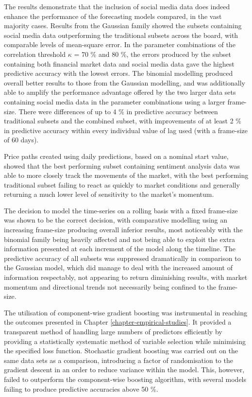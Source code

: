 \documentclass{article}
\begin{document}
The results demonstrate that the inclusion of social media data does indeed enhance the performance of the forecasting models compared, in the vast majority cases. Results from the Gaussian family showed the subsets containing social media data outperforming the traditional subsets across the board, with comparable levels of mean-square error. In the parameter combinations of the correlation threshold $\kappa$ = 70 \% and 80 \%, the errors produced by the subset containing both financial market data and social media data gave the highest predictive accuracy with the lowest errors. The binomial modelling produced overall better results to those from the Gaussian modelling, and was additionally able to amplify the performance advantage offered by the two larger data sets containing social media data in the parameter combinations using a larger frame-size. There were differences of up to 4 \% in predictive accuracy between traditional subsets and the combined subset, with improvements of at least 2 \% in predictive accuracy within every individual value of lag used (with a frame-size of 60 days). 

Price paths created using daily predictions, based on a nominal start value, showed that the best performing subset containing sentiment analysis data was able to more closely track the movements of the market, with the best performing traditional subset failing to react as quickly to market conditions and generally returning a much lower level of sensitivity to the market's momentum.

The decision to model the time-series on a rolling basis with a fixed frame-size was shown to be the correct decision, with comparative modelling using an increasing frame-size producing overall inferior results, most noticeably with the binomial family being heavily affected and not being able to exploit the extra information presented at each increment of the model along the timeline. The predictive accuracy of all subsets was suppressed dramatically in comparison to the Gaussian model, which did manage to deal with the increased amount of information respectably, not appearing to return diminishing results, with market momentum and directional trends not necessarily being confined to the frame-size.

The utilisation of component-wise gradient boosting was instrumental in reaching the outcomes presented in Chapter \ref{chapter-empirical-studies}. It provided a transparent method of handling large numbers of predictors efficiently by providing a statistically systematic method of variable selection while minimising the specified loss function. Stochastic gradient boosting was carried out on the same data sets as a comparison, introducing a factor of randomisation to the gradient descent in an order to reduce variance within the model. This, however, failed to outperform the component-wise boosting algorithm, with several models failing to produce predictive accuracies above 50 \%. 
\end{document}
